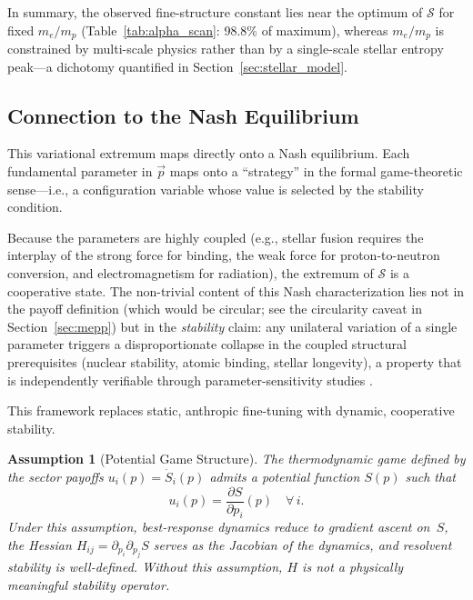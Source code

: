 \documentclass[12pt,a4paper]{article}
\newtheorem{assumption}{Assumption}
\theoremstyle{remark}
\begin{document}
In summary, the observed fine-structure constant lies near the optimum of $\mathcal{S}$ for fixed $m_e/m_p$ (Table~\ref{tab:alpha_scan}: 98.8\% of maximum), whereas $m_e/m_p$ is constrained by multi-scale physics rather than by a single-scale stellar entropy peak---a dichotomy quantified in Section~\ref{sec:stellar_model}.

\subsection{Connection to the Nash Equilibrium}

This variational extremum maps directly onto a Nash equilibrium. Each fundamental parameter in $\vec{p}$ maps onto a ``strategy'' in the formal game-theoretic sense---i.e., a configuration variable whose value is selected by the stability condition.

Because the parameters are highly coupled (e.g., stellar fusion requires the interplay of the strong force for binding, the weak force for proton-to-neutron conversion, and electromagnetism for radiation), the extremum of $\mathcal{S}$ is a cooperative state. The non-trivial content of this Nash characterization lies not in the payoff definition (which would be circular; see the circularity caveat in Section~\ref{sec:mepp}) but in the \emph{stability} claim: any unilateral variation of a single parameter triggers a disproportionate collapse in the coupled structural prerequisites (nuclear stability, atomic binding, stellar longevity), a property that is independently verifiable through parameter-sensitivity studies \citep{Adams2019}.

This framework replaces static, anthropic fine-tuning with dynamic, cooperative stability.

\begin{assumption}[Potential Game Structure]\label{ass:potential-game}
The thermodynamic game defined by the sector payoffs $u_i(p) = \dot{S}_i(p)$ admits a \emph{potential function} $S(p)$ such that
\[
  u_i(p) = \frac{\partial S}{\partial p_i}(p) \quad \forall\, i.
\]
Under this assumption, best-response dynamics reduce to gradient ascent on~$S$, the Hessian $H_{ij} = \partial_{p_i}\partial_{p_j} S$ serves as the Jacobian of the dynamics, and resolvent stability is well-defined. Without this assumption, $H$ is not a physically meaningful stability operator.
\end{assumption}
\end{document}
